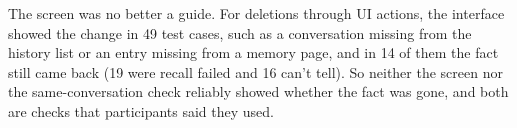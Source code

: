     The screen was no better a guide. For deletions through UI actions, the interface showed the change in 49 test cases, such as a conversation missing from the history list or an entry missing from a memory page, and in 14 of them the fact still came back (19 were recall failed and 16 can't tell). So neither the screen nor the same-conversation check reliably showed whether the fact was gone, and both are checks that participants said they used.
